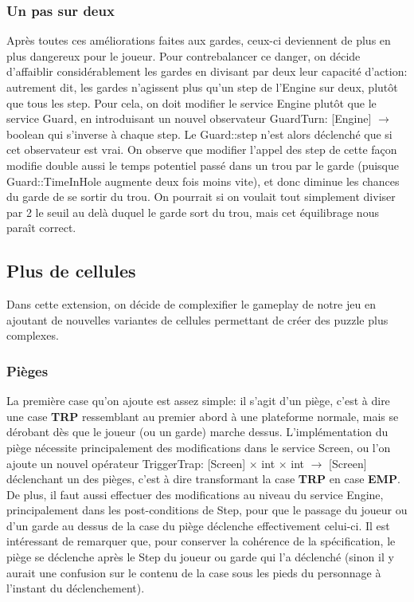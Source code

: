 \documentclass{article}
\begin{document}
\subsubsection{Un pas sur deux}
Après toutes ces améliorations faites aux gardes, ceux-ci deviennent de plus en plus dangereux pour le joueur. Pour contrebalancer ce danger, on décide d'affaiblir considérablement les gardes en divisant par deux leur capacité d'action: autrement dit, les gardes n'agissent plus qu'un \textrm{step} de l'\textrm{Engine} sur deux, plutôt que tous les \textrm{step}. Pour cela, on doit modifier le service \textrm{Engine} plutôt que le service \textrm{Guard}, en introduisant un nouvel observateur \textrm{GuardTurn: [Engine] $\rightarrow$ boolean} qui s'inverse à chaque \textrm{step}. Le \textrm{Guard::step} n'est alors déclenché que si cet observateur est vrai. On observe que modifier l'appel des \textrm{step} de cette façon modifie double aussi le temps potentiel passé dans un trou par le garde (puisque \textrm{Guard::TimeInHole} augmente deux fois moins vite), et donc diminue les chances du garde de se sortir du trou. On pourrait si on voulait tout simplement diviser par 2 le seuil au delà duquel le garde sort du trou, mais cet équilibrage nous paraît correct.

\subsection{Plus de cellules}
Dans cette extension, on décide de complexifier le gameplay de notre jeu en ajoutant de nouvelles variantes de cellules permettant de créer des puzzle plus complexes.

\subsubsection{Pièges}
La première case qu'on ajoute est assez simple: il s'agit d'un piège, c'est à dire une case \textbf{TRP} ressemblant au premier abord à une plateforme normale, mais se dérobant dès que le joueur (ou un garde) marche dessus.
L'implémentation du piège nécessite principalement des modifications dans le service \textrm{Screen}, ou l'on ajoute un nouvel opérateur \textrm{TriggerTrap: [Screen] $\times$ int $\times$ int $\rightarrow$ [Screen]} déclenchant un des pièges, c'est à dire transformant la case \textbf{TRP} en case \textbf{EMP}. De plus, il faut aussi effectuer des modifications au niveau du service \textrm{Engine}, principalement dans les post-conditions de \textrm{Step}, pour que le passage du joueur ou d'un garde au dessus de la case du piège déclenche effectivement celui-ci. Il est intéressant de remarquer que, pour conserver la cohérence de la spécification, le piège se déclenche après le \textrm{Step} du joueur ou garde qui l'a déclenché (sinon il y aurait une confusion sur le contenu de la case sous les pieds du personnage à l'instant du déclenchement).\\
\end{document}
